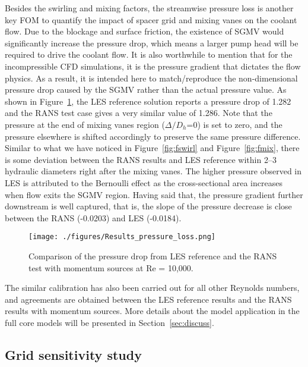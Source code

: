 Besides the swirling and mixing factors, the streamwise pressure loss is another key FOM to quantify the impact of spacer grid and mixing vanes on the coolant flow. Due to the blockage and surface friction, the existence of SGMV would significantly increase the pressure drop, which means a larger pump head will be required to drive the coolant flow. It is also worthwhile to mention that for the incompressible CFD simulations, it is the pressure gradient that dictates the flow physics. As a result, it is intended here to match/reproduce the non-dimensional pressure drop caused by the SGMV rather than the actual pressure value. As shown in Figure~\ref{fig:presloss}, the LES reference solution reports a pressure drop of 1.282 and the RANS test case gives a very similar value of 1.286. Note that the pressure at the end of mixing vanes region ($\Delta/D_h$=0) is set to zero, and the pressure elsewhere is shifted accordingly to preserve the same pressure difference. Similar to what we have noticed in Figure~\ref{fig:fswirl} and Figure~\ref{fig:fmix}, there is some deviation between the RANS results and LES reference within 2--3 hydraulic diameters right after the mixing vanes. The higher pressure observed in LES is attributed to the Bernoulli effect as the cross-sectional area increases when flow exits the SGMV region.  Having said that, the pressure gradient further downstream is well captured, that is, the slope of the pressure decrease is close between the RANS (-0.0203) and LES (-0.0184).

\begin{figure}[!ht]
\centering
\texttt{[image: ./figures/Results\_pressure\_loss.png]}
\caption{Comparison of the pressure drop from LES reference and the RANS test with momentum sources at Re = 10,000. }
\label{fig:presloss}
\end{figure}

The similar calibration has also been carried out for all other Reynolds numbers, and agreements are obtained between the LES reference results and the RANS results with momentum sources. More details about the model application in the full core models will be presented in Section~\ref{sec:discuss}.

\subsection{Grid sensitivity study}
\label{sec:msm3}

